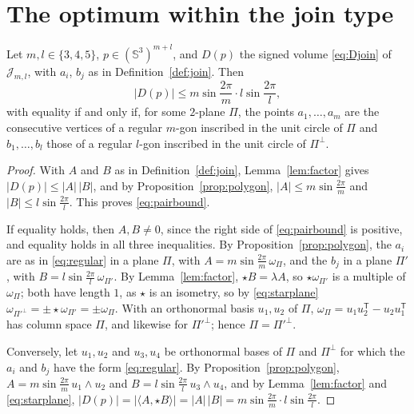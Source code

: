\section{The optimum within the join type}
\label{sec:pair}

\begin{theorem}
  \label{thm:pair}
  Let $m, l \in \{3, 4, 5\}$, $p \in (\mathbb{S}^{3})^{m+l}$, and $D(p)$ the
  signed volume \eqref{eq:Djoin} of $\mathcal{J}_{m,l}$, with $a_{i}$, $b_{j}$
  as in Definition~\ref{def:join}. Then
  \begin{equation}
    \label{eq:pairbound}
    |D(p)| \leq m\sin\frac{2\pi}{m}\cdot l\sin\frac{2\pi}{l},
  \end{equation}
  with equality if and only if, for some $2$-plane $\Pi$, the points $a_{1},
  \ldots, a_{m}$ are the consecutive vertices of a regular $m$-gon inscribed in
  the unit circle of $\Pi$ and $b_{1}, \ldots, b_{l}$ those of a regular
  $l$-gon inscribed in the unit circle of $\Pi^{\perp}$.
\end{theorem}

\begin{proof}
  With $A$ and $B$ as in Definition~\ref{def:join},
  Lemma~\ref{lem:factor} gives $|D(p)| \leq |A|\,|B|$, and by
  Proposition~\ref{prop:polygon}, $|A| \leq m\sin\frac{2\pi}{m}$ and $|B| \leq
  l\sin\frac{2\pi}{l}$. This proves \eqref{eq:pairbound}.

  If equality holds, then $A, B \neq 0$, since the right side of
  \eqref{eq:pairbound} is positive, and equality holds in all three
  inequalities. By Proposition~\ref{prop:polygon}, the $a_{i}$ are as in
  \eqref{eq:regular} in a plane $\Pi$, with $A = m\sin\frac{2\pi}{m}\,
  \omega_{\Pi}$, and the $b_{j}$ in a plane $\Pi'$, with $B =
  l\sin\frac{2\pi}{l}\,\omega_{\Pi'}$. By Lemma~\ref{lem:factor}, $\star B =
  \lambda A$, so $\star\omega_{\Pi'}$ is a multiple of $\omega_{\Pi}$; both
  have length $1$, as $\star$ is an isometry, so by \eqref{eq:starplane}
  $\omega_{\Pi'^{\perp}} = \pm\star\omega_{\Pi'} = \pm\omega_{\Pi}$. With an
  orthonormal basis $u_{1}, u_{2}$ of $\Pi$, $\omega_{\Pi} = u_{1}u_{2}^{\mathsf{T}} -
  u_{2}u_{1}^{\mathsf{T}}$ has column space $\Pi$, and likewise for
  $\Pi'^{\perp}$; hence $\Pi = \Pi'^{\perp}$.

  Conversely, let $u_{1}, u_{2}$ and $u_{3}, u_{4}$ be orthonormal bases of
  $\Pi$ and $\Pi^{\perp}$ for which the $a_{i}$ and $b_{j}$ have the form
  \eqref{eq:regular}. By Proposition~\ref{prop:polygon}, $A = m\sin\frac{2\pi}{m}\,u_{1}
  \wedge u_{2}$ and $B = l\sin\frac{2\pi}{l}\,u_{3} \wedge u_{4}$, and by
  Lemma~\ref{lem:factor} and \eqref{eq:starplane}, $|D(p)| = |\langle A, \star
  B\rangle| = |A|\,|B| = m\sin\frac{2\pi}{m}\cdot l\sin\frac{2\pi}{l}$.
\end{proof}

